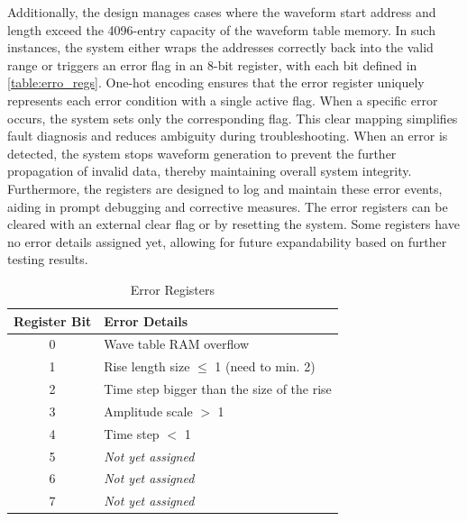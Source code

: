 Additionally, the design manages cases where the waveform start address and length exceed the 4096-entry capacity of the waveform table memory. In such instances, the system either wraps the addresses correctly back into the valid range or triggers an error flag in an 8-bit register, with each bit defined in \autoref{table:erro_regs}. One-hot encoding ensures that the error register uniquely represents each error condition with a single active flag. When a specific error occurs, the system sets only the corresponding flag. This clear mapping simplifies fault diagnosis and reduces ambiguity during troubleshooting. When an error is detected, the system stops waveform generation to prevent the further propagation of invalid data, thereby maintaining overall system integrity. Furthermore, the registers are designed to log and maintain these error events, aiding in prompt debugging and corrective measures. The error registers can be cleared with an external clear flag or by resetting the system. Some registers have no error details assigned yet, allowing for future expandability based on further testing results.
\begin{table}[h]
\setlength{\abovecaptionskip}{5pt}    %
\setlength{\belowcaptionskip}{5pt}    %
\centering
\caption{Error Registers}
\label{table:erro_regs}
\begin{tabular}{|c|l|}
\hline
Register Bit & Error Details \\
\hline
0 & Wave table RAM overflow \\
\hline
1 & Rise length size $\leq$ 1 (need to min. 2) \\
\hline
2 & Time step bigger than the size of the rise \\
\hline
3 & Amplitude scale $>$ 1 \\
\hline
4 & Time step $<$ 1 \\
\hline
5 & \textit{Not yet assigned} \\
\hline
6 & \textit{Not yet assigned} \\
\hline
7 & \textit{Not yet assigned} \\
\hline
\end{tabular}
\end{table}